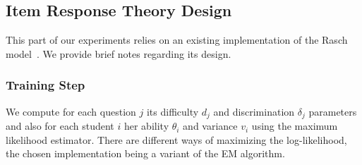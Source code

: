 \documentclass{sig-alternate}
\begin{document}
%


\subsection{Item Response Theory Design}

This part of our experiments relies on an existing implementation of the Rasch model~\cite{Rizopoulos2006}. We provide brief notes regarding its design.

\subsubsection{Training Step}

We compute for each question $j$ its difficulty $d_j$ and discrimination $\delta_j$ parameters and also for each student $i$ her ability $\theta_i$ and variance $v_i$ using the maximum likelihood estimator. There are different ways of maximizing the log-likelihood, the chosen implementation being a variant of the EM algorithm. %
\end{document}

